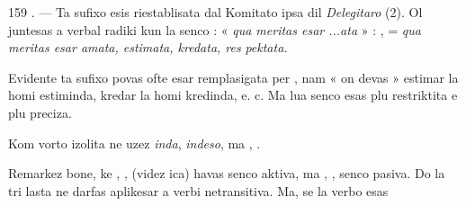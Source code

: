 \begin{VUpage}[163]{159}
. --- Ta sufixo esis riestablisata dal Komitato ipsa\nl
dil \textit{Delegitaro} (2). Ol juntesas a verbal radiki kun la senco :\nl
« \textit{qua meritas esar ...ata} » : ,\nl
{} = \textit{qua meritas esar amata, estimata, kredata, res}\cc
\textit{pektata.}

Evidente ta sufixo povas ofte esar remplasigata per ,\nl
nam « on devas » estimar la homi estiminda, kredar la\nl
homi kredinda, e. c. Ma lua senco esas plu restriktita e plu\nl
preciza.

Kom vorto izolita ne uzez \textit{inda}, \textit{indeso}, ma , .\parplein

Remarkez bone, ke , ,  (videz ica) havas senco\nl
aktiva, ma , ,  senco pasiva. Do la tri lasta ne\nl
darfas aplikesar a verbi netransitiva. Ma, se la verbo esas\parplein
\end{VUpage}


